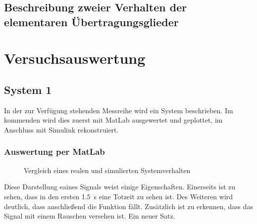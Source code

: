 \documentclass[12pt, oneside, a4paper]{scrreprt}
\begin{document}
\section{Beschreibung zweier Verhalten der elementaren Übertragungsglieder}

\chapter{Versuchsauswertung}
\section{System 1}
In der zur Verfügung stehenden Messreihe wird ein System beschrieben. Im kommenden wird dies zuerst mit MatLab ausgewertet und geplottet, im Anschluss mit Simulink rekonstruiert. 
\subsection{Auswertung per MatLab}





\begin{figure}[H]
\centering
{}
\caption{Vergleich eines realen und simulierten Systemverhalten}
\end{figure}

Diese Darstellung eaines Signals weist einige Eigenschaften. Einerseits ist zu sehen, dass in den ersten \SI{1.5}{\second} eine Totzeit zu sehen ist. Des Weiteren wird deutlich, dass anschließend die Funktion fällt. Zusätzlich ist zu erkennen, dass das Signal mit einem Rauschen versehen ist.
Ein neuer Satz.
\end{document}
